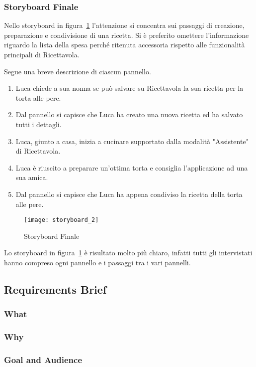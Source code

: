 \subsubsection{Storyboard Finale}

Nello storyboard in figura~\ref{fig:storyboard_2} l'attenzione si concentra sui passaggi di creazione, preparazione e condivisione di una ricetta.
Si è preferito omettere l'informazione riguardo la lista della spesa perché ritenuta accessoria rispetto alle funzionalità principali di Ricettavola.

Segue una breve descrizione di ciascun pannello.
\begin{enumerate}
  \item Luca chiede a sua nonna se può salvare su Ricettavola la sua ricetta per la torta alle pere.
  \item Dal pannello si capisce che Luca ha creato una nuova ricetta ed ha salvato tutti i dettagli.
  \item Luca, giunto a casa, inizia a cucinare supportato dalla modalità "Assistente" di Ricettavola.
  \item Luca è riuscito a preparare un'ottima torta e consiglia l'applicazione ad una sua amica.
  \item Dal pannello si capisce che Luca ha appena condiviso la ricetta della torta alle pere.
\end{enumerate}

\clearpage
\begin{figure}[!ht]
  \begin{center}
    \texttt{[image: storyboard\_2]}
    \caption{Storyboard Finale}
    \label{fig:storyboard_2}
  \end{center}
\end{figure}
\clearpage

Lo storyboard in figura~\ref{fig:storyboard_2} è risultato molto più chiaro, infatti tutti gli intervistati hanno compreso ogni pannello e i passaggi tra i vari pannelli.


\subsection{Requirements Brief}
\subsubsection{What}
\subsubsection{Why}
\subsubsection{Goal and Audience}

